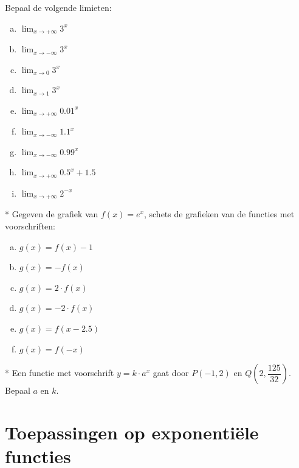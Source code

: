 \documentclass[12pt,twoside]{article}
\begin{document}
\begin{oefening}
Bepaal de volgende limieten:
\begin{multicols}{3}
\begin{enumerate}[(a)]
  \item $\displaystyle\lim_{x\to+\infty}3^x$
  \item $\displaystyle\lim_{x\to-\infty}3^x$
  \item $\displaystyle\lim_{x\to0}3^x$
  \item $\displaystyle\lim_{x\to1}3^x$
  \item $\displaystyle\lim_{x\to+\infty}0.01^x$
  \item $\displaystyle\lim_{x\to-\infty}1.1^x$
  \item $\displaystyle\lim_{x\to-\infty}0.99^x$
  \item $\displaystyle\lim_{x\to+\infty}0.5^x+1.5$
  \item $\displaystyle\lim_{x\to+\infty}2^{-x}$
\end{enumerate}
\end{multicols}
\end{oefening}

\begin{oefening}*
Gegeven de grafiek van $f(x)=e^x$, schets de grafieken van de functies met voorschriften:
\begin{multicols}{3}
\begin{enumerate}[(a)]
  \item $g(x)=f(x)-1$
  \item $g(x)=-f(x)$
  \item $g(x)=2\cdot f(x)$
  \item $g(x)=-2\cdot f(x)$
  \item $g(x)=f(x-2.5)$
  \item $g(x)=f(-x)$
\end{enumerate}
\end{multicols}
\end{oefening}

\begin{oefening}*
Een functie met voorschrift $y=k\cdot a^x$ gaat door $P(-1,2)$ en $Q(2,\dfrac{125}{32})$. Bepaal $a$ en $k$.
\end{oefening}

\pagebreak

\section{Toepassingen op exponentiële functies}
\end{document}
